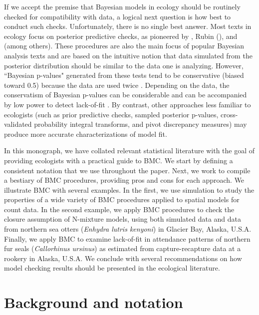 \documentclass[12pt,english]{article}
\begin{document}
\begin{spacing}{1.9}
If we accept the premise that Bayesian models in ecology should be
routinely checked for compatibility with data, a logical next question
is how best to conduct such checks.  Unfortunately, there is no single
best answer.  Most texts in ecology
\citep[e.g.,][]{KingEtAl2009,LinkBarker2010,KerySchaub2012} focus on
posterior predictive checks, as pioneered by \citet{Guttman1967},
Rubin (\citeyear{Rubin1981,Rubin1984}), and \citet{GelmanEtAl1996}
(among others).  These procedures are also the main focus of popular
Bayesian analysis texts
\citep[e.g.,][]{CressieWikle2011,GelmanEtAl2014} and are based on the
intuitive notion that data simulated from the posterior distribution
should be similar to the data one is analyzing.  However, ``Bayesian
p-values" generated from these tests tend to be conservative (biased
toward 0.5) because the data are used twice \citep[once to fit the
model and once to test the
model;][]{BayarriBerger2000,RobinsEtAl2000}.  Depending on the data,
the conservatism of Bayesian p-values can be considerable
\citep{Zhang2014} and can be accompanied by low power to detect
lack-of-fit \citep{YuanJohnson2012,Zhang2014}. By contrast, other
approaches less familiar to ecologists (such as prior predictive
checks, sampled posterior p-values, cross-validated probability
integral transforms, and pivot discrepancy measures) may produce more
accurate characterizations of model fit.

In this monograph, we have collated relevant statistical literature
with the goal of providing ecologists with a practical guide to
BMC.  We start by defining a consistent notation
that we use throughout the paper. Next, we work to compile a bestiary
of BMC procedures, providing pros and cons for each approach.  We illustrate BMC with several examples.  In the first, we use simulation to study the properties of a wide variety of BMC procedures applied to spatial models for count data.  In the second example, we apply BMC procedures to check the closure assumption of N-mixture models, using both simulated data and data from northern sea otters (\textit{Enhydra lutris kenyoni}) in Glacier Bay,
Alaska, U.S.A.  Finally, we apply BMC to examine lack-of-fit in attendance patterns of northern fur seals (\textit{Callorhinus ursinus}) as estimated from capture-recapture data
 at a rookery in Alaska, U.S.A.
  We conclude with several recommendations on how model
checking results should be presented in the ecological literature.



\section{Background and notation}


\end{spacing}
\end{document}

